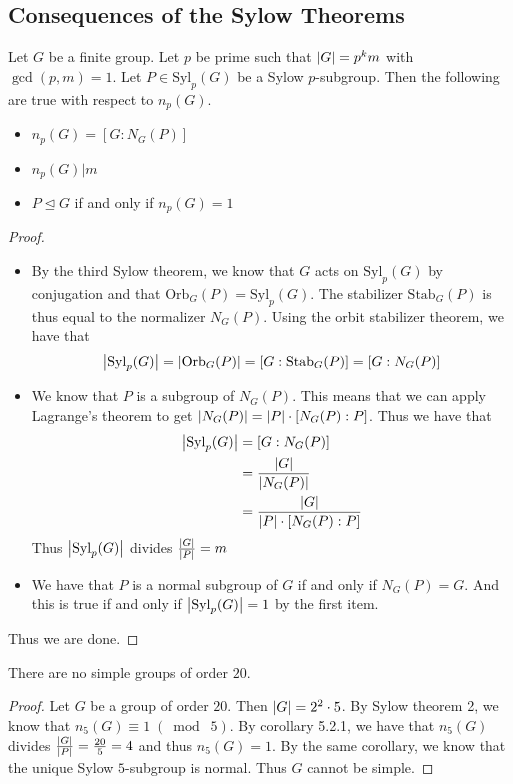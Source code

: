 \documentclass[a4paper]{article}
\begin{document}
\subsection{Consequences of the Sylow Theorems}
\begin{crl}{}{} Let $G$ be a finite group. Let $p$ be prime such that $\abs{G}=p^km$ with $\gcd(p,m)=1$. Let $P\in\text{Syl}_p(G)$ be a Sylow $p$-subgroup. Then the following are true with respect to $n_p(G)$. 
\begin{itemize}
\item $n_p(G)=[G:N_G(P)]$
\item $n_p(G)|m$
\item $P\trianglelefteq G$ if and only if $n_p(G)=1$
\end{itemize} 
\begin{proof}~\\
\begin{itemize}
\item By the third Sylow theorem, we know that $G$ acts on $\text{Syl}_p(G)$ by conjugation and that $\text{Orb}_G(P)=\text{Syl}_p(G)$. The stabilizer $\text{Stab}_G(P)$ is thus equal to the normalizer $N_G(P)$. Using the orbit stabilizer theorem, we have that $$\abs{\text{Syl}_p(G)}=\abs{\text{Orb}_G(P)}=[G:\text{Stab}_G(P)]=[G:N_G(P)]$$
\item We know that $P$ is a subgroup of $N_G(P)$. This means that we can apply Lagrange's theorem to get $\abs{N_G(P)}=\abs{P}\cdot[N_G(P):P]$. Thus we have that 
\begin{align*}
\abs{\text{Syl}_p(G)}&=[G:N_G(P)]\\
&=\frac{\abs{G}}{\abs{N_G(P)}}\\
&=\frac{\abs{G}}{\abs{P}\cdot[N_G(P):P]}
\end{align*}
Thus $\abs{\text{Syl}_p(G)}$ divides $\frac{\abs{G}}{\abs{P}}=m$
\item We have that $P$ is a normal subgroup of $G$ if and only if $N_G(P)=G$. And this is true if and only if $\abs{\text{Syl}_p(G)}=1$ by the first item. 
\end{itemize}
Thus we are done. 
\end{proof}
\end{crl}

\begin{prp}{}{} There are no simple groups of order $20$. 
\begin{proof}
Let $G$ be a group of order $20$. Then $\abs{G}=2^2\cdot 5$. By Sylow theorem 2, we know that $n_5(G)\equiv 1\;(\bmod\;5)$. By corollary 5.2.1, we have that $n_5(G)$ divides $\frac{\abs{G}}{\abs{P}}=\frac{20}{5}=4$ and thus $n_5(G)=1$. By the same corollary, we know that the unique Sylow $5$-subgroup is normal. Thus $G$ cannot be simple. 
\end{proof}
\end{prp}
\end{document}

